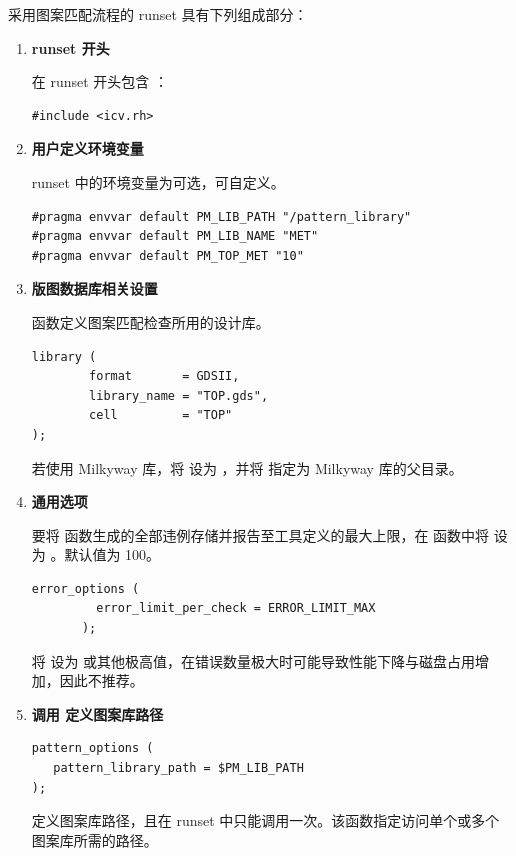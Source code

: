 采用图案匹配流程的 runset 具有下列组成部分：

\begin{enumerate}
  \item \textbf{runset 开头}

  在 runset 开头包含 ：
\begin{lstlisting}[style=pxl]
#include <icv.rh>
\end{lstlisting}

  \item \textbf{用户定义环境变量}

  runset 中的环境变量为可选，可自定义。
\begin{lstlisting}[style=pxl]
#pragma envvar default PM_LIB_PATH "/pattern_library"
#pragma envvar default PM_LIB_NAME "MET"
#pragma envvar default PM_TOP_MET "10"
\end{lstlisting}

  \item \textbf{版图数据库相关设置}

   函数定义图案匹配检查所用的设计库。
\begin{lstlisting}[style=pxl]
library (
        format       = GDSII,
        library_name = "TOP.gds",
        cell         = "TOP"
);
\end{lstlisting}

  若使用 Milkyway 库，将  设为 ，并将  指定为 Milkyway 库的父目录。

  \item \textbf{通用选项}

  要将  函数生成的全部违例存储并报告至工具定义的最大上限，在  函数中将  设为 。默认值为 100。
\begin{lstlisting}[style=pxl]
error_options (
         error_limit_per_check = ERROR_LIMIT_MAX
       );
\end{lstlisting}

  将  设为  或其他极高值，在错误数量极大时可能导致性能下降与磁盘占用增加，因此不推荐。

  \item \textbf{调用  定义图案库路径}
\begin{lstlisting}[style=pxl]
pattern_options (
   pattern_library_path = $PM_LIB_PATH
);
\end{lstlisting}

   定义图案库路径，且在 runset 中只能调用一次。该函数指定访问单个或多个图案库所需的路径。


\end{enumerate}
